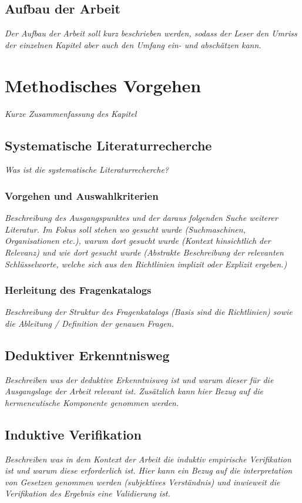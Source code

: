 \documentclass[11pt,a4paper]{article}   %
\begin{document}
    \subsection{Aufbau der Arbeit}
        \emph{Der Aufbau der Arbeit soll kurz beschrieben werden, sodass der Leser den Umriss der einzelnen Kapitel aber auch den Umfang ein- und abschätzen kann.}


    \newpage
    \section{Methodisches Vorgehen}
        \emph{Kurze Zusammenfassung des Kapitel}
        \subsection{Systematische Literaturrecherche}
            \emph{Was ist die systematische Literaturrecherche?}
            \subsubsection{Vorgehen und Auswahlkriterien}
                \emph{Beschreibung des Ausgangspunktes und der daraus folgenden Suche weiterer Literatur. Im Fokus soll stehen wo gesucht wurde (Suchmaschinen, Organisationen etc.), warum dort gesucht wurde (Kontext hinsichtlich der Relevanz) und wie dort gesucht wurde (Abstrakte Beschreibung der relevanten Schlüsselworte, welche sich aus den Richtlinien implizit oder Explizit ergeben.)}
            \subsubsection{Herleitung des Fragenkatalogs}
                \emph{Beschreibung der Struktur des Fragenkatalogs (Basis sind die Richtlinien) sowie die Ableitung / Definition der genauen Fragen.}
        \subsection{Deduktiver Erkenntnisweg}
            \emph{Beschreiben was der deduktive Erkenntnisweg ist und warum dieser für die Ausgangslage der Arbeit relevant ist. Zusätzlich kann hier Bezug auf die hermeneutische Komponente genommen werden.}
        \subsection{Induktive Verifikation}
            \emph{Beschreiben was in dem Kontext der Arbeit die induktiv empirische Verifikation ist und warum diese erforderlich ist. Hier kann ein Bezug auf die interpretation von Gesetzen genommen werden (subjektives Verständnis) und inwieweit die Verifikation des Ergebnis eine Validierung ist.}
\end{document}
